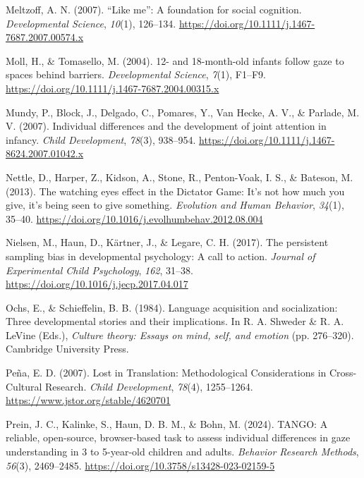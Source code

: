 \documentclass[
  man,floatsintext]{apa7}
\newlength{\cslhangindent}
\newenvironment{CSLReferences}[2] %
 {\begin{list}{}{%
  \setlength{\itemindent}{0pt}
  \setlength{\leftmargin}{0pt}
  \setlength{\parsep}{0pt}
  \ifodd #1
   \setlength{\leftmargin}{\cslhangindent}
   \setlength{\itemindent}{-1\cslhangindent}
  \fi
  \setlength{\itemsep}{#2\baselineskip}}}
 {\end{list}}
\begin{document}
\begin{CSLReferences}{1}{0}
Meltzoff, A. N. (2007). {``{Like} me''}: A foundation for social cognition. \emph{Developmental Science}, \emph{10}(1), 126--134. \url{https://doi.org/10.1111/j.1467-7687.2007.00574.x}

Moll, H., \& Tomasello, M. (2004). 12- and 18-month-old infants follow gaze to spaces behind barriers. \emph{Developmental Science}, \emph{7}(1), F1--F9. \url{https://doi.org/10.1111/j.1467-7687.2004.00315.x}

Mundy, P., Block, J., Delgado, C., Pomares, Y., Van Hecke, A. V., \& Parlade, M. V. (2007). Individual differences and the development of joint attention in infancy. \emph{Child Development}, \emph{78}(3), 938--954. \url{https://doi.org/10.1111/j.1467-8624.2007.01042.x}

Nettle, D., Harper, Z., Kidson, A., Stone, R., Penton-Voak, I. S., \& Bateson, M. (2013). The watching eyes effect in the {Dictator Game}: It's not how much you give, it's being seen to give something. \emph{Evolution and Human Behavior}, \emph{34}(1), 35--40. \url{https://doi.org/10.1016/j.evolhumbehav.2012.08.004}

Nielsen, M., Haun, D., Kärtner, J., \& Legare, C. H. (2017). The persistent sampling bias in developmental psychology: {A} call to action. \emph{Journal of Experimental Child Psychology}, \emph{162}, 31--38. \url{https://doi.org/10.1016/j.jecp.2017.04.017}

Ochs, E., \& Schieffelin, B. B. (1984). Language acquisition and socialization: {Three} developmental stories and their implications. In R. A. Shweder \& R. A. LeVine (Eds.), \emph{Culture theory: {Essays} on mind, self, and emotion} (pp. 276--320). Cambridge University Press.

Peña, E. D. (2007). Lost in {Translation}: {Methodological Considerations} in {Cross-Cultural Research}. \emph{Child Development}, \emph{78}(4), 1255--1264. \url{https://www.jstor.org/stable/4620701}

Prein, J. C., Kalinke, S., Haun, D. B. M., \& Bohn, M. (2024). {TANGO}: {A} reliable, open-source, browser-based task to assess individual differences in gaze understanding in 3 to 5-year-old children and adults. \emph{Behavior Research Methods}, \emph{56}(3), 2469--2485. \url{https://doi.org/10.3758/s13428-023-02159-5}


\end{CSLReferences}
\end{document}

